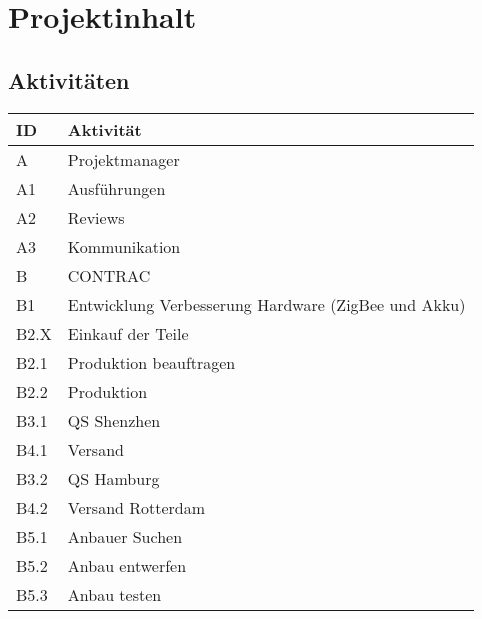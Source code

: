 \section{Projektinhalt}
\subsection{Aktivitäten}
\begin{table}[H]
    \renewcommand{\arraystretch}{1.05}
    \begin{center}
        \begin{tabular}{l|l}
            \hline
            \textbf{ID} & \textbf{Aktivität}\\\hline
            A    & Projektmanager                                      \\ \hline
            A1   & Ausführungen                                        \\ \hline
            A2   & Reviews                                             \\ \hline
            A3 & Kommunikation \\\hline
            B    & CONTRAC                                             \\ \hline
            B1   & Entwicklung Verbesserung Hardware (ZigBee und Akku) \\ \hline
            B2.X & Einkauf der Teile\\\hline
            B2.1 & Produktion beauftragen                              \\ \hline
            B2.2 & Produktion                                          \\ \hline
            B3.1 & QS Shenzhen                                         \\ \hline
            B4.1 & Versand                                             \\ \hline
            B3.2 & QS Hamburg                                          \\ \hline
            B4.2 & Versand Rotterdam                                   \\ \hline
            B5.1 & Anbauer Suchen                                      \\ \hline
            B5.2 & Anbau entwerfen                                     \\ \hline
            B5.3 & Anbau testen                                        \\ \hline

\end{tabular}
\end{center}
\end{table}
